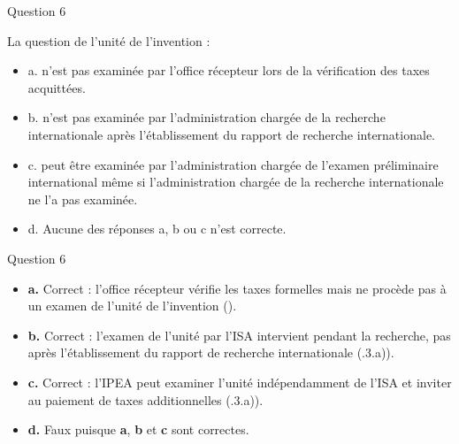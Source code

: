 \begin{frame}{Question 6}

\begin{block}{}
La question de l’unité de l’invention :

\begin{itemize}
  \item[$\bullet$] a. n’est pas examinée par l’office récepteur lors de la vérification des taxes acquittées. 
  \item[$\bullet$] b. n’est pas examinée par l’administration chargée de la recherche internationale après 
  l’établissement du rapport de recherche internationale. 
  \item[$\bullet$] c. peut être examinée par l’administration chargée de l’examen préliminaire 
  international même si l’administration chargée de la recherche internationale ne l’a 
  pas examinée. 
  \item[$\circ$] d. Aucune des réponses a, b ou c n’est correcte. 
\end{itemize}

\end{block}

\end{frame}

\begin{frame}{Question 6}

\begin{itemize}
  \item[$\bullet$] \textbf{a.} \; Correct : l’office récepteur vérifie les taxes formelles
  mais ne procède pas à un examen de l’unité de l’invention ().

  \item[$\bullet$] \textbf{b.} \; Correct : l’examen de l’unité par l’ISA intervient pendant la recherche,
  pas après l’établissement du rapport de recherche internationale
  (.3.a)).

  \item[$\bullet$] \textbf{c.} \; Correct : l’IPEA peut examiner l’unité indépendamment
  de l’ISA et inviter au paiement de taxes additionnelles
  (.3.a)).

  \item[$\circ$] \textbf{d.} \; Faux puisque \textbf{a}, \textbf{b} et \textbf{c} sont correctes.
\end{itemize}

\end{frame}
